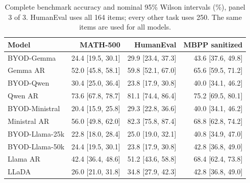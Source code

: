 \begin{table}[ht]
\caption{Complete benchmark accuracy and nominal 95\% Wilson intervals (\%), panel 3 of 3. HumanEval uses all 164 items; every other task uses 250. The same items are used for all models.}
\label{tab:benchmark-intervals-3}
\centering
\small
\begin{tabular}{lrrr}
\toprule
Model & MATH-500 & HumanEval & MBPP sanitized \\
\midrule
BYOD-Gemma & 24.4 [19.5, 30.1] & 29.9 [23.4, 37.3] & 43.6 [37.6, 49.8] \\
Gemma AR & 52.0 [45.8, 58.1] & 59.8 [52.1, 67.0] & 65.6 [59.5, 71.2] \\
BYOD-Qwen & 30.4 [25.0, 36.4] & 23.8 [17.9, 30.8] & 40.0 [34.1, 46.2] \\
Qwen AR & 73.6 [67.8, 78.7] & 81.1 [74.4, 86.4] & 75.2 [69.5, 80.1] \\
BYOD-Ministral & 20.4 [15.9, 25.8] & 29.3 [22.8, 36.6] & 40.0 [34.1, 46.2] \\
Ministral AR & 56.0 [49.8, 62.0] & 82.3 [75.8, 87.4] & 68.8 [62.8, 74.2] \\
BYOD-Llama-25k & 22.8 [18.0, 28.4] & 25.0 [19.0, 32.1] & 40.8 [34.9, 47.0] \\
BYOD-Llama-50k & 24.4 [19.5, 30.1] & 23.8 [17.9, 30.8] & 42.8 [36.8, 49.0] \\
Llama AR & 42.4 [36.4, 48.6] & 51.2 [43.6, 58.8] & 68.4 [62.4, 73.8] \\
LLaDA & 26.0 [21.0, 31.8] & 34.8 [27.9, 42.3] & 42.8 [36.8, 49.0] \\
\bottomrule
\end{tabular}
\end{table}
